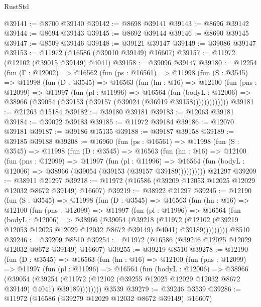 \begin{lexlean}{RustStd}
\begin{coremodule}
@39141 := @8700 @39140
@39142 := @8698 @39141
@39143 := @8696 @39142
@39144 := @8694 @39143
@39145 := @8692 @39144
@39146 := @8690 @39145
@39147 := @8509 @39146
@39148 := @39121 @39147
@39149 := @39086 @39147
@39153 := @11972 (@16586 (@39010 @39149) @16607)
@39157 := @11972 (@12102 (@39015 @39149) @4041)
@39158 := @39096 @39147
@39180 := @12254
    (fun (Γ : @12002) =>
    @16562
      (fun (ps : @16561) =>
      @11998
        (fun (S : @3545) =>
        @11998
          (fun (D : @3545) =>
          @16563
            (fun (hn : @16) =>
            @12100
              (fun (pns : @12099) =>
              @11997
                (fun (pl : @11996) =>
                @16564
                  (fun (bodyL : @12006) =>
                  @38966 (@39054 (@39153 (@39157 (@39024 (@36919 @39158)))))))))))))
@39181 := @21263 @15184
@39182 := @39180 @39181
@39183 := @12063 @39181
@39184 := @39022 @39183
@39185 := @11972 @39184
@39186 := @12070 @39181
@39187 := @39186 @15135
@39188 := @39187 @39158
@39189 := @39185 @39188
@39208 := @16960
    (fun (ps : @16561) =>
    @11998
      (fun (S : @3545) =>
      @11998
        (fun (D : @3545) =>
        @16563
          (fun (hn : @16) =>
          @12100
            (fun (pns : @12099) =>
            @11997
              (fun (pl : @11996) =>
              @16564 (fun (bodyL : @12006) => @38966 (@39054 (@39153 (@39157 @39189))))))))))
    @21297
@39209 := @38911 @21297
@39218 := @11972 (@16586 (@39209 @12053 @12025 @12029 @12032 @8672 @39149) @16607)
@39219 := @38922 @21297
@39245 := @12190
    (fun (S : @3545) =>
    @11998
      (fun (D : @3545) =>
      @16563
        (fun (hn : @16) =>
        @12100
          (fun (pns : @12099) =>
          @11997
            (fun (pl : @11996) =>
            @16564
              (fun (bodyL : @12006) =>
              @38966
                (@39054
                  (@39218
                    (@11972
                      (@12102 (@39219 @12053 @12025 @12029 @12032 @8672 @39149) @4041)
                      @39189)))))))))
    @8510
@39246 := @39209 @8510
@39254 := @11972 (@16586 (@39246 @12025 @12029 @12032 @8672 @39149) @16607)
@39255 := @39219 @8510
@39278 := @12190
    (fun (D : @3545) =>
    @16563
      (fun (hn : @16) =>
      @12100
        (fun (pns : @12099) =>
        @11997
          (fun (pl : @11996) =>
          @16564
            (fun (bodyL : @12006) =>
            @38966
              (@39054
                (@39254
                  (@11972 (@12102 (@39255 @12025 @12029 @12032 @8672 @39149) @4041) @39189))))))))
    @3539
@39279 := @39246 @3539
@39286 := @11972 (@16586 (@39279 @12029 @12032 @8672 @39149) @16607)

\end{coremodule}
\end{lexlean}
